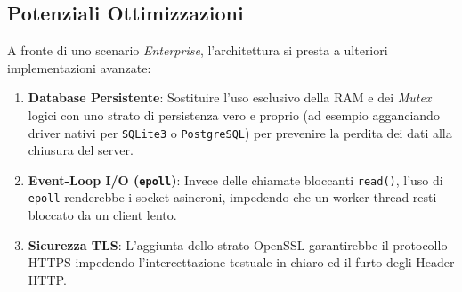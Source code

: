 \documentclass[a4paper,12pt]{article}
\begin{document}
\subsection{Potenziali Ottimizzazioni}
A fronte di uno scenario \textit{Enterprise}, l'architettura si presta a ulteriori implementazioni avanzate:
\begin{enumerate}
    \item \textbf{Database Persistente}: Sostituire l'uso esclusivo della RAM e dei \textit{Mutex} logici con uno strato di persistenza vero e proprio (ad esempio agganciando driver nativi per \texttt{SQLite3} o \texttt{PostgreSQL}) per prevenire la perdita dei dati alla chiusura del server.
    \item \textbf{Event-Loop I/O (\texttt{epoll})}: Invece delle chiamate bloccanti \texttt{read()}, l'uso di \texttt{epoll} renderebbe i socket asincroni, impedendo che un worker thread resti bloccato da un client lento.
    \item \textbf{Sicurezza TLS}: L'aggiunta dello strato OpenSSL garantirebbe il protocollo HTTPS impedendo l'intercettazione testuale in chiaro ed il furto degli Header HTTP.
\end{enumerate}
\end{document}
